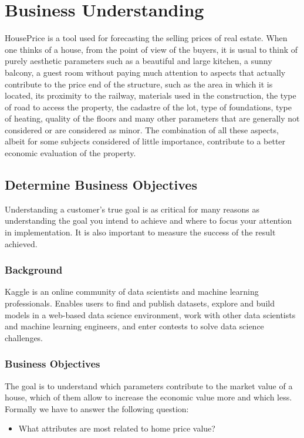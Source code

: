 \chapter{Business Understanding}

HousePrice is a tool used for forecasting the selling prices of real estate. When one thinks of a house, from the point of view of the buyers, it is usual to think of purely aesthetic parameters such as a beautiful and large kitchen, a sunny balcony, a guest room without paying much attention to aspects that actually contribute to the price end of the structure, such as the area in which it is located, its proximity to the railway, materials used in the construction, the type of road to access the property, the cadastre of the lot, type of foundations, type of heating, quality of the floors and many other parameters that are generally not considered or are considered as minor. The combination of all these aspects, albeit for some subjects considered of little importance, contribute to a better economic evaluation of the property.



\section{Determine Business Objectives}
Understanding a customer's true goal is as critical for many reasons as understanding the goal you intend to achieve and where to focus your attention in implementation. It is also important to measure the success of the result achieved.

\subsection{Background}
Kaggle is an online community of data scientists and machine learning professionals. Enables users to find and publish datasets, explore and build models in a web-based data science environment, work with other data scientists and machine learning engineers, and enter contests to solve data science challenges.

\subsection{Business Objectives}
The goal is to understand which parameters contribute to the market value of a house, which of them allow to increase the economic value more and which less. Formally we have to answer the following question:
\begin{itemize}
    \item What attributes are most related to home price value?
\end{itemize}

